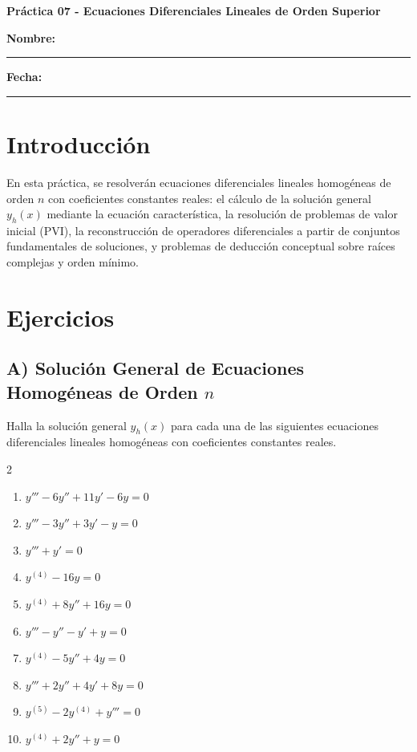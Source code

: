 \documentclass[a4paper,11pt]{article}
\begin{document}
\begin{center}
    \Large\textbf{Práctica 07 - Ecuaciones Diferenciales Lineales de Orden Superior}\\[0.5cm]  
\end{center}
  \textbf{Nombre:} \rule{9cm}{0.4pt}  \textbf{Fecha:} \rule{4.5cm}{0.4pt}

\section*{Introducción}
En esta práctica, se resolverán ecuaciones diferenciales lineales homogéneas de orden $n$ con coeficientes constantes reales: el cálculo de la solución general $y_h(x)$ mediante la ecuación característica, la resolución de problemas de valor inicial (PVI), la reconstrucción de operadores diferenciales a partir de conjuntos fundamentales de soluciones, y problemas de deducción conceptual sobre raíces complejas y orden mínimo.

\section*{Ejercicios}

\subsection*{A) Solución General de Ecuaciones Homogéneas de Orden $n$}
Halla la solución general $y_h(x)$ para cada una de las siguientes ecuaciones diferenciales lineales homogéneas con coeficientes constantes reales.

\begin{multicols}{2}
\begin{enumerate}[itemsep=0.15cm]
    \item $y''' - 6y'' + 11y' - 6y = 0$
    \item $y''' - 3y'' + 3y' - y = 0$
    \item $y''' + y' = 0$
    \item $y^{(4)} - 16y = 0$
    \item $y^{(4)} + 8y'' + 16y = 0$
    \item $y''' - y'' - y' + y = 0$
    \item $y^{(4)} - 5y'' + 4y = 0$
    \item $y''' + 2y'' + 4y' + 8y = 0$
    \item $y^{(5)} - 2y^{(4)} + y''' = 0$
    \item $y^{(4)} + 2y'' + y = 0$
\end{enumerate}
\end{multicols}
\end{document}

